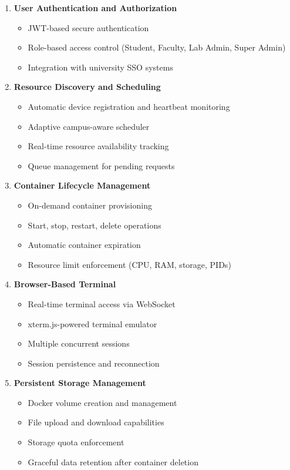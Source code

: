 \documentclass[12pt,a4paper]{article}
\begin{document}
\begin{enumerate}
    \item \textbf{User Authentication and Authorization}
    \begin{itemize}
        \item JWT-based secure authentication
        \item Role-based access control (Student, Faculty, Lab Admin, Super Admin)
        \item Integration with university SSO systems
    \end{itemize}
    
    \item \textbf{Resource Discovery and Scheduling}
    \begin{itemize}
        \item Automatic device registration and heartbeat monitoring
        \item Adaptive campus-aware scheduler
        \item Real-time resource availability tracking
        \item Queue management for pending requests
    \end{itemize}
    \item \textbf{Container Lifecycle Management}
    \begin{itemize}
        \item On-demand container provisioning
        \item Start, stop, restart, delete operations
        \item Automatic container expiration
        \item Resource limit enforcement (CPU, RAM, storage, PIDs)
    \end{itemize}
    
    \item \textbf{Browser-Based Terminal}
    \begin{itemize}
        \item Real-time terminal access via WebSocket
        \item xterm.js-powered terminal emulator
        \item Multiple concurrent sessions
        \item Session persistence and reconnection
    \end{itemize}
    
    \item \textbf{Persistent Storage Management}
    \begin{itemize}
        \item Docker volume creation and management
        \item File upload and download capabilities
        \item Storage quota enforcement
        \item Graceful data retention after container deletion
    \end{itemize}
    

\end{enumerate}
\end{document}
